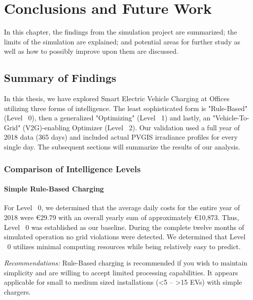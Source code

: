 \chapter{Conclusions and Future Work} 
\label{ch:conclusions} 
In this chapter, the findings from the simulation project are summarized; the limits of the simulation are explained; and potential areas for further study as well as how to possibly improve upon them are discussed.

\section{Summary of Findings} 
\label{sec:summary} 
In this thesis, we have explored Smart Electric Vehicle Charging at Offices utilizing three forms of intelligence. The least sophisticated form is "Rule-Based" (Level ~0), then a generalized "Optimizing" (Level ~1) and lastly, an "Vehicle-To-Grid" (V2G)-enabling Optimizer (Level ~2). Our validation used a full year of 2018 data (365 days) and included actual PVGIS irradiance profiles for every single day. The subsequent sections will summarize the results of our analysis.

\subsection{Comparison of Intelligence Levels} 
\label{subsec:intelligence_comparison}

\subsubsection{Simple Rule-Based Charging} 
\label{subsubsec:simple_rule_based}

For Level ~0, we determined that the average daily costs for the entire year of 2018 were €29.79 with an overall yearly sum of approximately €10,873. Thus, Level ~0 was established as our baseline. During the complete twelve months of simulated operation no grid violations were detected. We determined that Level ~0 utilizes minimal computing resources while being relatively easy to predict.

\emph{Recommendations:} Rule-Based charging is recommended if you wish to maintain simplicity and are willing to accept limited processing capabilities. It appears applicable for small to medium sized installations (<5 -- >15 EVs) with simple chargers.

